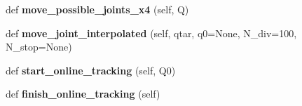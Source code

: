 \begin{DoxyCompactItemize}
def {\bfseries move\+\_\+possible\+\_\+joints\+\_\+x4} (self, Q)
\item 
\mbox{\label{classrnb-planning_1_1src_1_1pkg_1_1controller_1_1repeater_1_1repeater_1_1_repeater_aff716f35447361c4fe2616bf3a2e8626}} 
def {\bfseries move\+\_\+joint\+\_\+interpolated} (self, qtar, q0=None, N\+\_\+div=100, N\+\_\+stop=None)
\item 
\mbox{\label{classrnb-planning_1_1src_1_1pkg_1_1controller_1_1repeater_1_1repeater_1_1_repeater_a51ff887dda4b14d0307073325b37cef4}} 
def {\bfseries start\+\_\+online\+\_\+tracking} (self, Q0)
\item 
\mbox{\label{classrnb-planning_1_1src_1_1pkg_1_1controller_1_1repeater_1_1repeater_1_1_repeater_a31d225acb0b6e2fab96a2bc2c24d1e83}} 
def {\bfseries finish\+\_\+online\+\_\+tracking} (self)
\end{DoxyCompactItemize}
